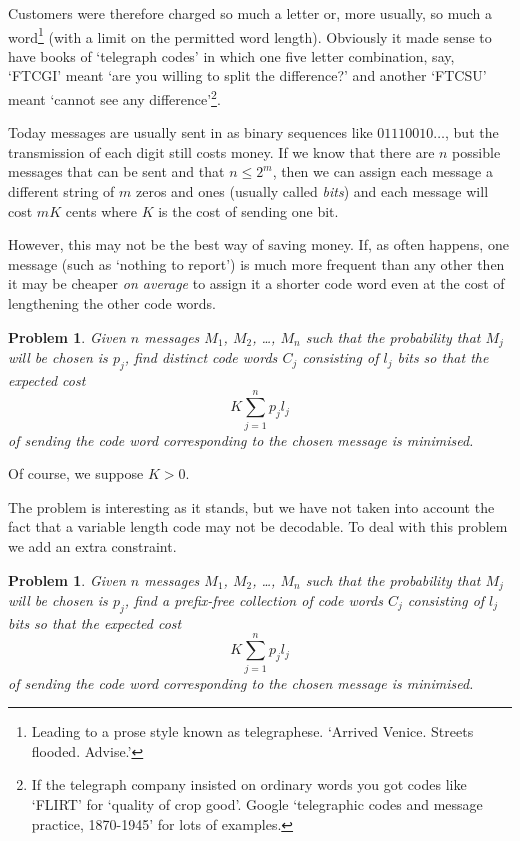 \documentclass[12pt,a4paper]{article}
\theoremstyle{plain}
\newtheorem{problem}[theorem]{Problem}
\theoremstyle{definition}
\begin{document}
    Customers were therefore charged so much
    a letter or, more usually, so
    much a word\footnote{Leading to a
    prose style known as telegraphese.
    `Arrived Venice. Streets flooded. Advise.'}
    (with a limit
    on the permitted word length).
    Obviously it made sense to have books
    of `telegraph codes' in which one five letter
    combination, say, `FTCGI'
    meant `are you willing to split the difference?'
    and another `FTCSU' meant
    `cannot see any difference'\footnote{If the telegraph
    company insisted on ordinary words you got
    codes like `FLIRT' for `quality of crop good'.
    Google `telegraphic codes and message practice, 1870-1945'
    for lots of examples.}.

    Today messages are usually sent in
    as binary sequences like $01110010\dots$,
    but the transmission of each digit still costs
    money. If we know that there are $n$ possible
    messages that can be sent and that $n\leq 2^{m}$,
    then we can assign each message a different
    string of $m$ zeros and ones (usually called \emph{bits})
    and each message will cost $mK$ cents where $K$
    is the cost of sending one bit.

    However, this may not be the best way of saving money.
    If, as often happens, one message
    (such as `nothing to report') is much more frequent
    than any other then it may be cheaper \emph{on average}
    to assign it a shorter code word even at the cost
    of lengthening the other code words.
    \begin{problem}
        \label{P;Compress one}
        Given $n$ messages $M_{1}$, $M_{2}$,
        \dots, $M_{n}$ such that the probability that $M_{j}$
        will be chosen is $p_{j}$, find distinct code words $C_{j}$
        consisting of $l_{j}$ bits so that the expected cost
        \[K\sum_{j=1}^{n}p_{j}l_{j}\]
        of sending the code word corresponding to the chosen
        message is minimised.
    \end{problem}
    Of course, we suppose $K>0$.

    The problem is interesting as it stands, but we
    have not taken into account the fact that a variable
    length code may not be decodable. To deal with this
    problem we add an extra constraint.
    \begin{problem}
        \label{P;Compress}
        Given $n$ messages $M_{1}$, $M_{2}$,
        \dots, $M_{n}$ such that the probability that $M_{j}$
        will be chosen is $p_{j}$, find a prefix-free
        collection of code words $C_{j}$
        consisting of $l_{j}$ bits so that the expected cost
        \[K\sum_{j=1}^{n}p_{j}l_{j}\]
        of sending the code word corresponding to the chosen
        message is minimised.
    \end{problem}
\end{document}

